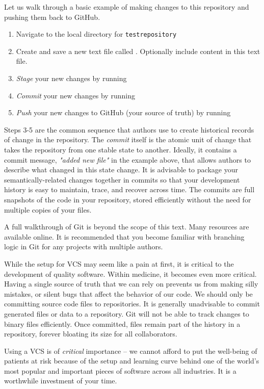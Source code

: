 Let us walk through a basic example of making changes to this repository and pushing them back to GitHub.

\begin{enumerate}
    \item Navigate to the local directory for \texttt{test\textunderscore repository}
    \item Create and save a new text file called . Optionally include content in this text file.
    \item \textit{Stage} your new changes by running 
    \item \textit{Commit} your new changes by running 
    \item \textit{Push} your new changes to GitHub (your source of truth) by running 
\end{enumerate}

Steps 3-5 are the common sequence that authors use to create historical records of change in the repository. The \textit{commit} itself is the atomic unit of change that takes the repository from one stable state to another. Ideally, it contains a commit message, \textit{"added new file"} in the example above, that allows authors to describe what changed in this state change.
It is advisable to package your semantically-related changes together in commits so that your development history is easy to maintain, trace, and recover across time. The commits are full snapshots of the code in your repository, stored efficiently without the need for multiple copies of your files.

A full walkthrough of Git is beyond the scope of this text. Many resources are available online. It is recommended that you become familiar with branching logic in Git for any projects with multiple authors.

While the setup for VCS may seem like a pain at first, it is critical to the development of quality software.
Within medicine, it becomes even more critical. Having a single source of truth that we can rely on prevents us from making silly mistakes, or silent bugs that affect the behavior of our code. We should only be committing source code files to repositories. It is generally unadvisable to commit generated files or data to a repository. Git will not be able to track changes to binary files efficiently. Once committed, files remain part of the history in a repository, forever bloating its size for all collaborators.

Using a VCS is of \textit{critical} importance -- we cannot afford to put the well-being of patients at risk because of the setup and learning curve behind one of the world's most popular and important pieces of software across all industries. It is a worthwhile investment of your time.